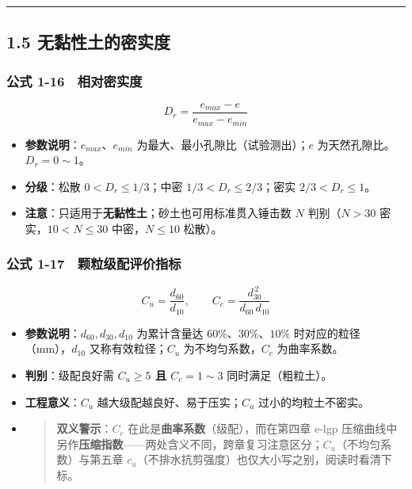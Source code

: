 \documentclass[
]{article}
\providecommand{\tightlist}{%
  \setlength{\itemsep}{0pt}\setlength{\parskip}{0pt}}
\begin{document}
\begin{center}\rule{0.5\linewidth}{0.5pt}\end{center}

\subsection{1.5
无黏性土的密实度}\label{ux65e0ux9ecfux6027ux571fux7684ux5bc6ux5b9eux5ea6}

\subsubsection{公式
1-16　相对密实度}\label{ux516cux5f0f-1-16-ux76f8ux5bf9ux5bc6ux5b9eux5ea6}

\[D_r=\frac{e_{max}-e}{e_{max}-e_{min}}\]

\begin{itemize}
\tightlist
\item
  \textbf{参数说明}：\(e_{max}\)、\(e_{min}\)
  为最大、最小孔隙比（试验测出）；\(e\) 为天然孔隙比。\(D_r=0\sim1\)。
\item
  \textbf{分级}：松散 \(0<D_r\le1/3\)；中密 \(1/3<D_r\le2/3\)；密实
  \(2/3<D_r\le1\)。
\item
  \textbf{注意}：只适用于\textbf{无黏性土}；砂土也可用标准贯入锤击数
  \(N\) 判别（\(N>30\) 密实，\(10<N\le30\) 中密，\(N\le10\) 松散）。
\end{itemize}

\subsubsection{公式
1-17　颗粒级配评价指标}\label{ux516cux5f0f-1-17-ux9897ux7c92ux7ea7ux914dux8bc4ux4ef7ux6307ux6807}

\[C_u=\frac{d_{60}}{d_{10}},\qquad C_c=\frac{d_{30}^{\,2}}{d_{60}\,d_{10}}\]

\begin{itemize}
\item
  \textbf{参数说明}：\(d_{60},d_{30},d_{10}\) 为累计含量达
  \(60\%\text{、}30\%\text{、}10\%\) 时对应的粒径（mm），\(d_{10}\)
  又称有效粒径；\(C_u\) 为不均匀系数，\(C_c\) 为曲率系数。
\item
  \textbf{判别}：级配良好需 \textbf{\(C_u\ge5\) 且 \(C_c=1\sim3\)}
  同时满足（粗粒土）。
\item
  \textbf{工程意义}：\(C_u\) 越大级配越良好、易于压实；\(C_u\)
  过小的均粒土不密实。
\item
  \begin{quote}
  \textbf{双义警示}：\(C_c\) 在此是\textbf{曲率系数}（级配），而在第四章
  e-lgp
  压缩曲线中另作\textbf{压缩指数}------两处含义不同，跨章复习注意区分；\(C_u\)（不均匀系数）与第五章
  \(c_u\)（不排水抗剪强度）也仅大小写之别，阅读时看清下标。
  \end{quote}
\end{itemize}
\end{document}
